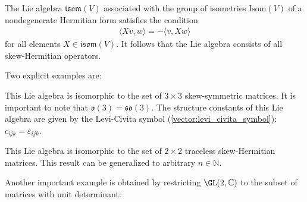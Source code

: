     \begin{example}[Isometries]\label{lie:lie_isometry}
        The Lie algebra $\mathfrak{isom}(V)$ associated with the group of isometries $\mathrm{Isom}(V)$ of a nondegenerate Hermitian form satisfies the condition
        \begin{gather}
            \langle Xv,w \rangle = -\langle v,Xw \rangle
        \end{gather}
        for all elements $X\in\mathfrak{isom}(V)$. It follows that the Lie algebra consists of all skew-Hermitian operators.
    \end{example}
    Two explicit examples are:
    \begin{example}\label{lie:so3}
        This Lie algebra is isomorphic to the set of $3\times3$ skew-symmetric matrices. It is important to note that $\mathfrak{o}(3)=\mathfrak{so}(3)$. The structure constants of this Lie algebra are given by the Levi-Civita symbol (\cref{vector:levi_civita_symbol}): $c_{ijk}=\varepsilon_{ijk}$.
    \end{example}
    \begin{example}
        This Lie algebra is isomorphic to the set of $2\times2$ traceless skew-Hermitian matrices. This result can be generalized to arbitrary $n\in\mathbb{N}$.
    \end{example}
    Another important example is obtained by restricting $\GL(2,\mathbb{C})$ to the subset of matrices with unit determinant:
